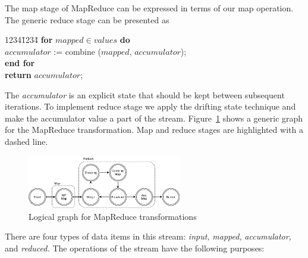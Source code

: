 
\label{fs-drifting}

The map stage of MapReduce can be expressed in terms of our map operation. 
The generic reduce stage can be presented as

\begin {tabbing}
1234\=1234\= \kill
{\bf for} $mapped \in values$ {\bf do}   \\
\>$accumulator$ := combine ($mapped$, $accumulator$); \\
{\bf end for} \\
{\bf return } $accumulator$;
\end {tabbing}

The {\it accumulator} is an explicit state that should be kept between subsequent iterations.
%
%
To implement reduce stage we apply the drifting state technique and make the accumulator value a part of the stream. 
Figure~\ref{mapreduce-graph-figure} shows a generic graph for the MapReduce transformation. 
Map and reduce stages are highlighted with a dashed line. 

\begin{figure}[ht]
  \centering
  \includegraphics[width=0.6\textwidth]{pics/mapreduce}
  \caption{Logical graph for MapReduce transformations}
  \label {mapreduce-graph-figure}
\end{figure}

There are four types of data items in this stream: {\it input,} {\it mapped,}   {\it accumulator,} and {\it  reduced.} 
The operations of the stream have the following purposes:

